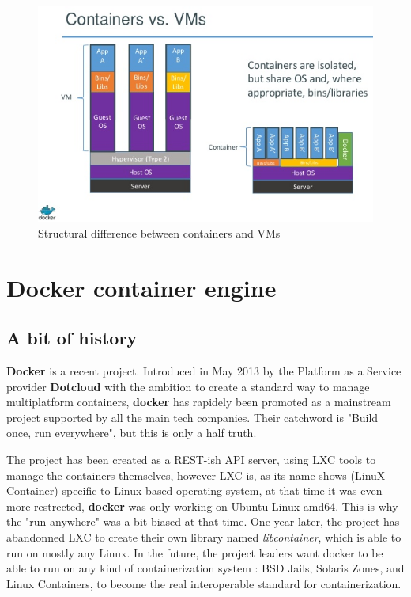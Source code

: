 \begin{figure}
	\includegraphics[width=\textwidth]{./Images/containers_vs_vms.png}
	\caption{Structural difference between containers and VMs}
\end{figure}

\section{Docker container engine}

\subsection{A bit of history}

\textbf{Docker} is a recent project. Introduced in May 2013 by the Platform as
a Service provider \textbf{Dotcloud} with the ambition to create a standard way
to manage multiplatform containers, \textbf{docker} has rapidely been promoted
as a mainstream project supported by all the main tech companies.  Their
catchword is "Build once, run everywhere", but this is only a half truth.

The project has been created as a REST-ish API server, using LXC tools to
manage the containers themselves, however LXC is, as its name shows (LinuX
Container) specific to Linux-based operating system, at that time it was even
more restrected, \textbf{docker} was only working on Ubuntu Linux amd64. This
is why the "run anywhere" was a bit biased at that time. One year later, the
project has abandonned LXC to create their own library named
\textit{libcontainer}, which is able to run on mostly any Linux. In the future,
the project leaders want docker to be able to run on any kind of
containerization system : BSD Jails, Solaris Zones, and Linux Containers, to
become the real interoperable standard for containerization.

